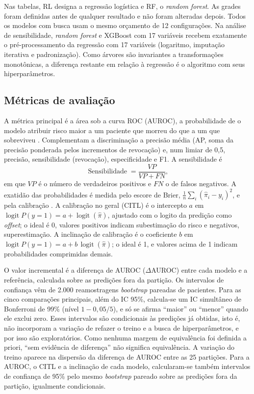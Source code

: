 Nas tabelas, RL designa a regressão logística e RF, o \textit{random forest}. As grades foram definidas antes de qualquer resultado e não foram alteradas depois. Todos os modelos com busca usam o mesmo orçamento de 12 configurações. Na análise de sensibilidade, \textit{random forest} e XGBoost com 17 variáveis recebem exatamente o pré-processamento da regressão com 17 variáveis (logaritmo, imputação iterativa e padronização). Como árvores são invariantes a transformações monotônicas, a diferença restante em relação à regressão é o algoritmo com seus hiperparâmetros.

\subsection{Métricas de avaliação}\label{subsec:metricas}
A métrica principal é a área sob a curva ROC (AUROC), a probabilidade de o modelo atribuir risco maior a um paciente que morreu do que a um que sobreviveu \cite{fawcett2006roc}. Complementam a discriminação a precisão média (AP, soma da precisão ponderada pelos incrementos de revocação) e, num limiar de 0,5, precisão, sensibilidade (revocação), especificidade e F1. A sensibilidade é
\begin{equation}
\operatorname{Sensibilidade}=\frac{VP}{VP+FN},
\label{eq:sensibilidade}
\end{equation}
em que $VP$ é o número de verdadeiros positivos e $FN$ o de falsos negativos. A exatidão das probabilidades é medida pelo escore de Brier, $\frac{1}{n}\sum_i(\hat{\pi}_i - y_i)^2$, e pela calibração \cite{vancalster2019calibration}. A calibração no geral (CITL) é o intercepto $a$ em $\operatorname{logit} P(y=1) = a + \operatorname{logit}(\hat{\pi})$, ajustado com o logito da predição como \textit{offset}; o ideal é 0, valores positivos indicam subestimação do risco e negativos, superestimação. A inclinação de calibração é o coeficiente $b$ em $\operatorname{logit} P(y=1) = a + b\,\operatorname{logit}(\hat{\pi})$; o ideal é 1, e valores acima de 1 indicam probabilidades comprimidas demais.

O valor incremental é a diferença de AUROC ($\Delta$AUROC) entre cada modelo e a referência, calculada sobre as predições fora da partição. Os intervalos de confiança vêm de 2.000 reamostragens \textit{bootstrap} pareadas de pacientes. Para as cinco comparações principais, além do IC 95\%, calcula-se um IC simultâneo de Bonferroni de 99\% (nível $1 - 0{,}05/5$), e só se afirma ``maior'' ou ``menor'' quando ele exclui zero. Esses intervalos são condicionais às predições já obtidas, isto é, não incorporam a variação de refazer o treino e a busca de hiperparâmetros, e por isso são exploratórios. Como nenhuma margem de equivalência foi definida a priori, ``sem evidência de diferença'' não significa equivalência. A variação do treino aparece na dispersão da diferença de AUROC entre as 25 partições. Para a AUROC, o CITL e a inclinação de cada modelo, calcularam-se também intervalos de confiança de 95\% pelo mesmo \textit{bootstrap} pareado sobre as predições fora da partição, igualmente condicionais.

